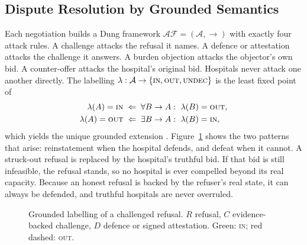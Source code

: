 \subsection{Dispute Resolution by Grounded Semantics}
\label{sec:argumentation}
Each negotiation builds a Dung framework $\mathcal{AF}=(\mathcal{A},\rightarrow)$ \cite{dung1995acceptability} with exactly four attack rules. A challenge attacks the refusal it names. A defence or attestation attacks the challenge it answers. A burden objection attacks the objector's own bid. A counter-offer attacks the hospital's original bid. Hospitals never attack one another directly. The labelling $\lambda:\mathcal{A}\to\{\textsc{in},\textsc{out},\textsc{undec}\}$ is the least fixed point of
\begin{align}
  \lambda(A)=\textsc{in} \;&\Leftarrow\; \forall B\rightarrow A:\ \lambda(B)=\textsc{out}, \label{eq:in}\\
  \lambda(A)=\textsc{out} \;&\Leftarrow\; \exists B\rightarrow A:\ \lambda(B)=\textsc{in}, \label{eq:out}
\end{align}
which yields the unique grounded extension \cite{baroni2011semantics}. Figure~\ref{fig:af} shows the two patterns that arise: reinstatement \cite{caminada2006reinstatement} when the hospital defends, and defeat when it cannot. A struck-out refusal is replaced by the hospital's truthful bid. If that bid is still infeasible, the refusal stands, so no hospital is ever compelled beyond its real capacity. Because an honest refusal is backed by the refuser's real state, it can always be defended, and truthful hospitals are never overruled.

\begin{figure}[!t]
\centering
{}
\caption{Grounded labelling of a challenged refusal. $R$ refusal, $C$ evidence-backed challenge, $D$ defence or signed attestation. Green: \textsc{in}; red dashed: \textsc{out}.}
\label{fig:af}
\end{figure}

